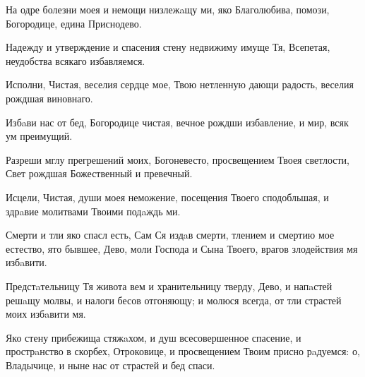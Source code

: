 \begin{mymulticols}
\slava

На одре болезни моея и немощи низлежaщу ми, яко Благолюбива, помози, Богородице, едина Приснодево.

\inyne

Надежду и утверждение и спасения стену недвижиму имуще Тя, Всепетая, неудобства всякаго избавляемся.




Исполни, Чистая, веселия сердце мое, Твою нетленную дающи радость, веселия рождшая виновнаго.


Избaви нас от бед, Богородице чистая, вечное рождши избавление, и мир, всяк ум преимущий.

\slava

Разреши мглу прегрешений моих, Богоневесто, просвещением Твоея светлости, Свет рождшая Божественный и превечный.

\inyne

Исцели, Чистая, души моея неможение, посещения Твоего сподобльшая, и здрaвие молитвами Твоими подaждь ми.




Смерти и тли яко спасл есть, Сам Ся издaв смерти, тлением и смертию мое естество, ято бывшее, Дево, моли Господа и Сына Твоего, врагов злодействия мя избaвити.


Предстaтельницу Тя живота вем и хранительницу тверду, Дево, и напaстей решaщу молвы, и налоги бесов отгоняющу; и молюся всегда, от тли страстей моих избaвити мя.

\slava

Яко стену прибежища стяжaхом, и душ всесовершенное спасение, и прострaнство в скорбех, Отроковице, и просвещением Твоим присно рaдуемся: о, Владычице, и ныне нас от страстей и бед спаси.

\inyne


\end{mymulticols}
